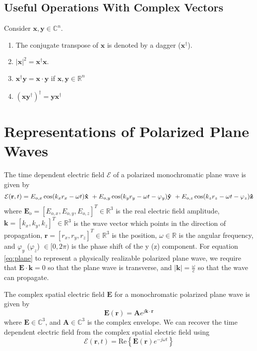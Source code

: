 \documentclass[11pt]{article}
\providecommand{\mb}[1]{\mathbf{#1}}
\providecommand{\mh}[1]{\mathbf{\hat{#1}}}
\begin{document}
\subsection{Useful Operations With Complex Vectors}
\label{math}
Consider $\mb{x}, \mb{y} \in \mathbb{C}^n$.
\begin{enumerate}
\item The conjugate transpose of $\mb{x}$ is denoted by a dagger ($\mb{x}^{\dagger}$).
\item $|\mb{x}|^2 = \mb{x}^{\dagger}\mb{x}$.
\item $\mb{x}^{\dagger}\mb{y} = \mb{x}\cdot \mb{y}$ if $\mb{x}, \mb{y}\in \mathbb{R}^n$
\item $(\mb{x}\mb{y}^{\dagger})^{\dagger} = \mb{y}\mb{x}^{\dagger}$
\end{enumerate}

\section{Representations of Polarized Plane Waves}
The time dependent electric field $\mathcal{E}$ of a polarized monochromatic
plane wave is given by
\begin{equation}
  \mathcal{E}(\mb{r},t) = E_{o,x}\cos(k_{x}r_{x} - \omega t)\mh{x}\ + \\
                     E_{o,y}\cos(k_{y}r_{y} - \omega t - \varphi_y)\mh{y}\ +\\
                     E_{o,z}\cos(k_{z}r_{z} - \omega t - \varphi_z)\mh{z}
                       \label{eq:plane}
\end{equation}
where $\mb{E}_{o} = [E_{o,x}, E_{o,y}, E_{o,z}]^T \in \mathbb{R}^3$ is the real
electric field amplitude, $\mb{k} = [k_x, k_y, k_z]^T \in \mathbb{R}^3$ is the
wave vector which points in the direction of propagation,
$\mb{r} = [r_x, r_y, r_z]^T \in \mathbb{R}^3$ is the position,
$\omega \in \mathbb{R}$ is the angular frequency, and $\varphi_y$ ($\varphi_z$)
$\in [0, 2\pi)$ is the phase shift of the y (z) component. For equation
\ref{eq:plane} to represent a physically realizable polarized plane wave, we
require that $\mb{E}\cdot \mb{k} = 0$ so that the plane wave is transverse, and
$|\mb{k}| = \frac{\omega}{c}$ so that the wave can propagate. 

The complex spatial electric field $\mb{E}$ for a monochromatic polarized plane wave is given by
\begin{equation}
  \mb{E}(\mb{r}) = \mb{A}e^{j\mb{k}\cdot\mb{r}}
  \label{eq:factor}
\end{equation}
where $\mb{E} \in \mathbb{C}^3$, and $\mb{A} \in \mathbb{C}^3$ is the complex
envelope. We can recover the time dependent electric field from the complex spatial
electric field using
\begin{equation}
  \mathcal{E}(\mb{r},t) = \text{Re}\left\{\mb{E}(\mb{r})e^{-j\omega t}\right\}
\end{equation}
\end{document}
